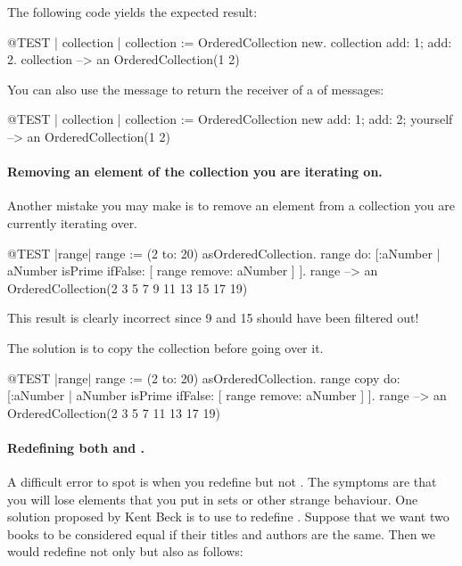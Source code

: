 \documentclass[a4paper,10pt,twoside]{book}
\begin{document}
The following code yields the expected result:
\begin{code}{@TEST | collection |}
collection := OrderedCollection new.
collection add: 1; add: 2.
collection --> an OrderedCollection(1 2)
\end{code}

You can also use the message  to return the receiver of a  of messages:

\begin{code}{@TEST | collection |}
collection := OrderedCollection new add: 1; add: 2; yourself --> an OrderedCollection(1 2)
\end{code}

\paragraph{Removing an element of the collection you are iterating on.} Another mistake you may make is to remove an element from a collection you are currently iterating over.
\begin{code}{@TEST |range|}
range := (2 to: 20) asOrderedCollection.
range do: [:aNumber | aNumber isPrime ifFalse: [ range remove: aNumber ] ].
range --> an OrderedCollection(2 3 5 7 9 11 13 15 17 19)
\end{code}
\noindent
This result is clearly incorrect since 9 and 15 should have been filtered out!

The solution is to copy the collection before going over it.
\begin{code}{@TEST |range|}
range := (2 to: 20) asOrderedCollection.
range copy do: [:aNumber | aNumber isPrime ifFalse: [ range remove: aNumber ] ].
range --> an OrderedCollection(2 3 5 7 11 13 17 19)
\end{code}

\paragraph{Redefining both \ct{=} and .}
A difficult error to spot is when you redefine \ct{=} but not . The symptoms are that you will lose elements that you put in sets or other strange behaviour. One solution proposed by Kent Beck is to use  to redefine .
Suppose that we want two books to be considered equal if their titles and authors are the same.
Then we would redefine not only \ct{=} but also  as follows:
\end{document}

